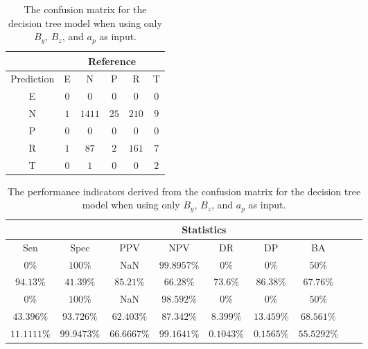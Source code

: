 \begin{table}[!ht]
	\centering
	\begin{tabular}{|c|c|c|c|c|c|}
		\hline
		 & \multicolumn{5}{|c|}{Reference} \\ \hline
		 Prediction & E & N & P & R & T \\ \hline
		 E & $0$ & $0$ & $0$ & $0$ & $0$ \\ \hline
		 N & $1$ & $1411$ & $25$ & $210$ & $9$ \\ \hline
		 P & $0$ & $0$ & $0$ & $0$ & $0$ \\ \hline
		 R & $1$ & $87$ & $2$ & $161$ & $7$ \\ \hline
		 T & $0$ & $1$ & $0$ & $0$ & $2$ \\ \hline
	\end{tabular}
	\caption{The confusion matrix for the decision tree model when using only $B_{y}$, $B_{z}$, and $a_{p}$ as input.}
	\label{tab:cm:yzap:C5.0}
\end{table}

\begin{table}[!ht]
	\centering
	\begin{tabular}{|c|c|c|c|c|c|c|c|c|}
		\hline
		 & \multicolumn{7}{c|}{Statistics} \\ \hline
		Sen & Spec & PPV & NPV & DR & DP & BA \\ \hline
		$0\%$ & $100\%$ & NaN & $99.8957\%$ & $0\%$ & $0\%$ & $50\%$ \\ \hline
		$94.13\%$ & $41.39\%$ & $85.21\%$ & $66.28\%$ & $73.6\%$ & $86.38\%$ & $67.76\%$ \\ \hline
		$0\%$ & $100\%$ & NaN & $98.592\%$ & $0\%$ & $0\%$ & $50\%$ \\ \hline
		$43.396\%$ & $93.726\%$ & $62.403\%$ & $87.342\%$ & $8.399\%$ & $13.459\%$ & $68.561\%$ \\ \hline
		$11.1111\%$ & $99.9473\%$ & $66.6667\%$ & $99.1641\%$ & $0.1043\%$ & $0.1565\%$ & $55.5292\%$ \\ \hline
	\end{tabular}
	\caption{The performance indicators derived from the confusion matrix for the decision tree model when using only $B_{y}$, $B_{z}$, and $a_{p}$ as input.}
	\label{tab:cs:yzap:C5.0}
\end{table}

